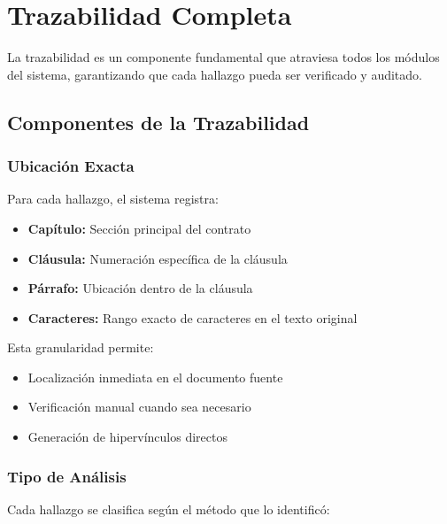 \documentclass[12pt,a4paper]{article}
\begin{document}
\section{Trazabilidad Completa}

\begin{tcolorbox}[colback=lightorange!20, colframe=orange!80!black, title=Sistema de Trazabilidad Transversal]
La trazabilidad es un componente fundamental que atraviesa todos los módulos del sistema, garantizando que cada hallazgo pueda ser verificado y auditado.
\end{tcolorbox}

\subsection{Componentes de la Trazabilidad}

\subsubsection{Ubicación Exacta}

Para cada hallazgo, el sistema registra:

\begin{itemize}[leftmargin=*]
    \item \textbf{Capítulo:} Sección principal del contrato
    \item \textbf{Cláusula:} Numeración específica de la cláusula
    \item \textbf{Párrafo:} Ubicación dentro de la cláusula
    \item \textbf{Caracteres:} Rango exacto de caracteres en el texto original
\end{itemize}

Esta granularidad permite:
\begin{itemize}
    \item Localización inmediata en el documento fuente
    \item Verificación manual cuando sea necesario
    \item Generación de hipervínculos directos
\end{itemize}

\subsubsection{Tipo de Análisis}

Cada hallazgo se clasifica según el método que lo identificó:
\end{document}
